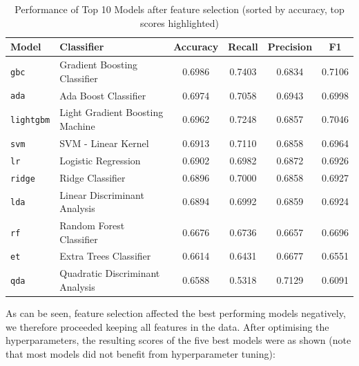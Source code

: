 \documentclass[a4paper,12pt]{article}
\begin{document}
\begin{table}[H]
    \centering
    \begin{tabular}{l l c c c c}
    \toprule
    \textbf{Model} & \textbf{Classifier} & \textbf{Accuracy} & \textbf{Recall} & \textbf{Precision} & \textbf{F1} \\
    \midrule
    \texttt{gbc} & Gradient Boosting Classifier & \cellcolor{yellow}0.6986 & \cellcolor{yellow}0.7403 & 0.6834 & \cellcolor{yellow}0.7106 \\
    \texttt{ada} & Ada Boost Classifier & 0.6974 & 0.7058 & 0.6943 & 0.6998 \\
    \texttt{lightgbm} & Light Gradient Boosting Machine & 0.6962 & 0.7248 & 0.6857 & 0.7046 \\
    \texttt{svm} & SVM - Linear Kernel & 0.6913 & 0.7110 & 0.6858 & 0.6964 \\
    \texttt{lr} & Logistic Regression & 0.6902 & 0.6982 & 0.6872 & 0.6926 \\
    \texttt{ridge} & Ridge Classifier & 0.6896 & 0.7000 & 0.6858 & 0.6927 \\
    \texttt{lda} & Linear Discriminant Analysis & 0.6894 & 0.6992 & 0.6859 & 0.6924 \\
    \texttt{rf} & Random Forest Classifier & 0.6676 & 0.6736 & 0.6657 & 0.6696 \\
    \texttt{et} & Extra Trees Classifier & 0.6614 & 0.6431 & 0.6677 & 0.6551 \\
    \texttt{qda} & Quadratic Discriminant Analysis & 0.6588 & 0.5318 & \cellcolor{yellow}0.7129 & 0.6091 \\
    \bottomrule
    \end{tabular}
    \caption{Performance of Top 10 Models after feature selection (sorted by accuracy, top scores highlighted)}
    \label{tab:model_performance_fs}
\end{table}

    
As can be seen, feature selection affected the best performing models negatively, we therefore 
proceeded keeping all features in the data.
After optimising the hyperparameters, the resulting scores of the five best models were as shown
(note that most models did not benefit from hyperparameter tuning): 
\end{document}
